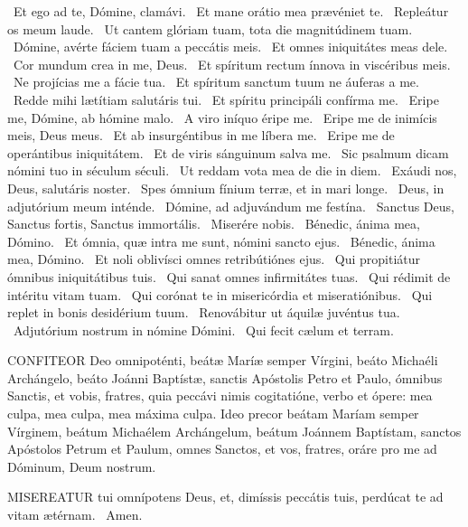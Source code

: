 \V\ Et ego ad te, Dómine, clamávi. \R\ Et mane orátio mea prævéniet te. \V\ Repleátur os meum laude. \R\ Ut cantem glóriam tuam, tota die magnitúdinem tuam. \V\ Dómine, avérte fáciem tuam a peccátis meis. \R\ Et omnes iniquitátes meas dele. \V\ Cor mundum crea in me, Deus. \R\ Et spíritum rectum ínnova in viscéribus meis. \V\ Ne projícias me a fácie tua. \R\ Et spíritum sanctum tuum ne áuferas a me. \V\ Redde mihi lætítiam salutáris tui. \R\ Et spíritu principáli confírma me. \V\ Eripe me, Dómine, ab hómine malo. \R\ A viro iníquo éripe me. \V\ Eripe me de inimícis meis, Deus meus. \R\ Et ab insurgéntibus in me líbera me. \V\ Eripe me de operántibus iniquitátem. \R\ Et de viris sánguinum salva me. \V\ Sic psalmum dicam nómini tuo in séculum séculi. \R\ Ut reddam vota mea de die in diem. \V\ Exáudi nos, Deus, salutáris noster. \R\ Spes ómnium fínium terræ, et in mari longe. \V\ Deus, in adjutórium meum inténde. \R\ Dómine, ad adjuvándum me festína. \V\ Sanctus Deus, Sanctus fortis, Sanctus immortális. \R\ Miserére nobis. \V\ Bénedic, ánima mea, Dómino. \R\ Et ómnia, quæ intra me sunt, nómini sancto ejus. \V\ Bénedic, ánima mea, Dómino. \R\ Et noli oblivísci omnes retribútiónes ejus. \V\ Qui propitiátur ómnibus iniquitátibus tuis. \R\ Qui sanat omnes infirmitátes tuas. \V\ Qui rédimit de intéritu vitam tuam. \R\ Qui corónat te in misericórdia et miseratiónibus. \V\ Qui replet in bonis desidérium tuum. \R\ Renovábitur ut áquilæ juvéntus tua. \V\ Adjutórium nostrum in nómine Dómini. \R\ Qui fecit cælum et terram.


\lettrine[lines=2]{C}{ONFITEOR} Deo omnipoténti, beátæ Maríæ semper Vírgini, beáto Michaéli Archángelo, beáto Joánni Baptístæ, sanctis Apóstolis Petro et Paulo, ómnibus Sanctis, et vobis, fratres, quia peccávi nimis cogitatióne, verbo et ópere: mea culpa, mea culpa, mea máxima culpa. Ideo precor beátam Maríam semper Vírginem, beátum Michaélem Archángelum, beátum Joánnem Baptístam, sanctos Apóstolos Petrum et Paulum, omnes Sanctos, et vos, fratres, oráre pro me ad Dóminum, Deum nostrum.


\lettrine[lines=2]{M}{ISEREATUR} tui omnípotens Deus, et, dimíssis peccátis tuis, perdúcat te ad vitam ætérnam. \R\ Amen.



